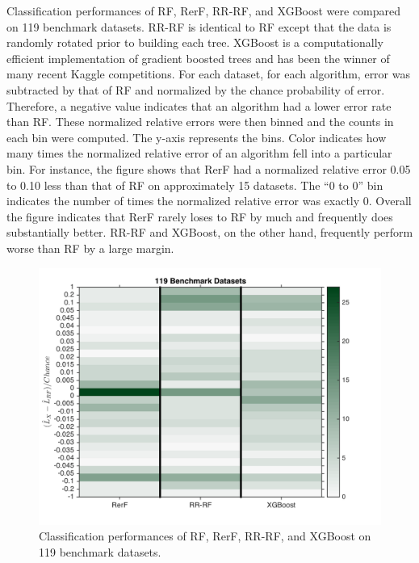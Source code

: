 \documentclass[simplex.tex]{subfiles}
\begin{document}
Classification performances of RF, RerF, RR-RF, and XGBoost were
compared on 119 benchmark datasets. RR-RF is identical to RF except that
the data is randomly rotated prior to building each tree. XGBoost is a
computationally efficient implementation of gradient boosted trees and
has been the winner of many recent Kaggle competitions. For each
dataset, for each algorithm, error was subtracted by that of RF and
normalized by the chance probability of error. Therefore, a negative
value indicates that an algorithm had a lower error rate than RF. These
normalized relative errors were then binned and the counts in each bin
were computed. The y-axis represents the bins. Color indicates how many
times the normalized relative error of an algorithm fell into a
particular bin. For instance, the figure shows that RerF had a
normalized relative error 0.05 to 0.10 less than that of RF on
approximately 15 datasets. The ``0 to 0'' bin indicates the number of
times the normalized relative error was exactly 0. Overall the figure
indicates that RerF rarely loses to RF by much and frequently does
substantially better. RR-RF and XGBoost, on the other hand, frequently
perform worse than RF by a large margin.

\begin{figure}[h!]
\begin{cframed}
\centering
\includegraphics[height=0.5\textheight]{../../figs/rerF_benchmark.png}
\caption{
Classification performances of RF, RerF, RR-RF, and XGBoost
on 119 benchmark datasets.
}
\label{fig:RefF3}
\end{cframed}
\end{figure}

\end{document}
